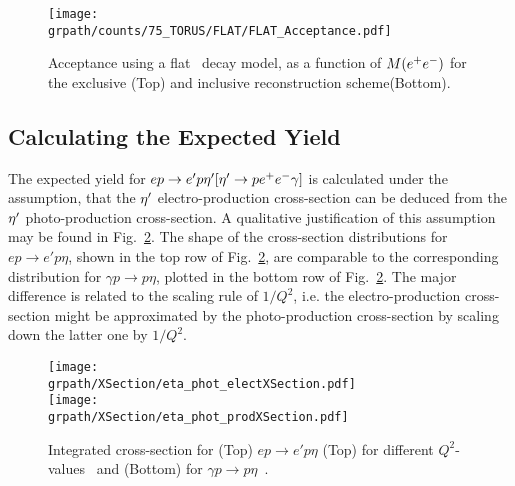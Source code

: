  \begin{figure}[h!]\begin{center}
 		\texttt{[image: \\grpath/counts/75\_TORUS/FLAT/FLAT\_Acceptance.pdf]}
 		\caption[Acceptance, as a function of $M(\epem)$]{\label{fig:FLATaccepted}{Acceptance using a flat \epemT \ decay model, as a function of $M(\epem)$ for the exclusive (Top) and inclusive reconstruction scheme(Bottom).}}
 \end{center}\end{figure} 
\FloatBarrier

\subsection{Calculating the Expected Yield}

The expected yield for $ep\to e'p \eta^{\prime} [\eta^{\prime}\rightarrow p e^+e^- \gamma ]$ is calculated under the assumption, that the $\eta^{\prime}$ electro-production cross-section can be deduced from the $\eta^{\prime}$ photo-production cross-section. A qualitative justification of this assumption may be found in Fig.~\ref{fig:EtaProdX}. The shape of the cross-section distributions for $ep\rightarrow e'p\eta$, shown in the top row of Fig.~\ref{fig:EtaProdX}, are comparable to the corresponding distribution for $\gamma p\rightarrow p\eta$, plotted in the bottom row of Fig.~\ref{fig:EtaProdX}. The major difference is related to the scaling rule of $1/Q^2$, i.e. the electro-production cross-section might be approximated by the photo-production cross-section by scaling down the latter one by $1/Q^2$.

\begin{figure}[h!]\begin{center}
		\texttt{[image: \\grpath/XSection/eta\_phot\_electXSection.pdf]}\\
		\texttt{[image: \\grpath/XSection/eta\_phot\_prodXSection.pdf]}
		\caption[eta el-prod. XSection]{\label{fig:EtaProdX}{Integrated cross-section for (Top) $ep\to e'p\eta$ (Top) for different $Q^2$-values~\cite{etaelect} and (Bottom) for $\gamma p\rightarrow p\eta$~\cite{etaphoto}.}}
\end{center}\end{figure}

